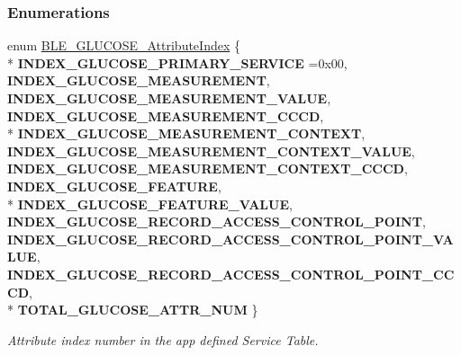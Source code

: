 \subsubsection*{Enumerations}
\begin{DoxyCompactItemize}
\item 
enum \hyperlink{group___b_l_e___g_s_gaebc08cd72805620fc1106a0b90462c83}{B\+L\+E\+\_\+\+G\+L\+U\+C\+O\+S\+E\+\_\+\+Attribute\+Index} \{ \\*
{\bfseries I\+N\+D\+E\+X\+\_\+\+G\+L\+U\+C\+O\+S\+E\+\_\+\+P\+R\+I\+M\+A\+R\+Y\+\_\+\+S\+E\+R\+V\+I\+CE} =0x00, 
{\bfseries I\+N\+D\+E\+X\+\_\+\+G\+L\+U\+C\+O\+S\+E\+\_\+\+M\+E\+A\+S\+U\+R\+E\+M\+E\+NT}, 
{\bfseries I\+N\+D\+E\+X\+\_\+\+G\+L\+U\+C\+O\+S\+E\+\_\+\+M\+E\+A\+S\+U\+R\+E\+M\+E\+N\+T\+\_\+\+V\+A\+L\+UE}, 
{\bfseries I\+N\+D\+E\+X\+\_\+\+G\+L\+U\+C\+O\+S\+E\+\_\+\+M\+E\+A\+S\+U\+R\+E\+M\+E\+N\+T\+\_\+\+C\+C\+CD}, 
\\*
{\bfseries I\+N\+D\+E\+X\+\_\+\+G\+L\+U\+C\+O\+S\+E\+\_\+\+M\+E\+A\+S\+U\+R\+E\+M\+E\+N\+T\+\_\+\+C\+O\+N\+T\+E\+XT}, 
{\bfseries I\+N\+D\+E\+X\+\_\+\+G\+L\+U\+C\+O\+S\+E\+\_\+\+M\+E\+A\+S\+U\+R\+E\+M\+E\+N\+T\+\_\+\+C\+O\+N\+T\+E\+X\+T\+\_\+\+V\+A\+L\+UE}, 
{\bfseries I\+N\+D\+E\+X\+\_\+\+G\+L\+U\+C\+O\+S\+E\+\_\+\+M\+E\+A\+S\+U\+R\+E\+M\+E\+N\+T\+\_\+\+C\+O\+N\+T\+E\+X\+T\+\_\+\+C\+C\+CD}, 
{\bfseries I\+N\+D\+E\+X\+\_\+\+G\+L\+U\+C\+O\+S\+E\+\_\+\+F\+E\+A\+T\+U\+RE}, 
\\*
{\bfseries I\+N\+D\+E\+X\+\_\+\+G\+L\+U\+C\+O\+S\+E\+\_\+\+F\+E\+A\+T\+U\+R\+E\+\_\+\+V\+A\+L\+UE}, 
{\bfseries I\+N\+D\+E\+X\+\_\+\+G\+L\+U\+C\+O\+S\+E\+\_\+\+R\+E\+C\+O\+R\+D\+\_\+\+A\+C\+C\+E\+S\+S\+\_\+\+C\+O\+N\+T\+R\+O\+L\+\_\+\+P\+O\+I\+NT}, 
{\bfseries I\+N\+D\+E\+X\+\_\+\+G\+L\+U\+C\+O\+S\+E\+\_\+\+R\+E\+C\+O\+R\+D\+\_\+\+A\+C\+C\+E\+S\+S\+\_\+\+C\+O\+N\+T\+R\+O\+L\+\_\+\+P\+O\+I\+N\+T\+\_\+\+V\+A\+L\+UE}, 
{\bfseries I\+N\+D\+E\+X\+\_\+\+G\+L\+U\+C\+O\+S\+E\+\_\+\+R\+E\+C\+O\+R\+D\+\_\+\+A\+C\+C\+E\+S\+S\+\_\+\+C\+O\+N\+T\+R\+O\+L\+\_\+\+P\+O\+I\+N\+T\+\_\+\+C\+C\+CD}, 
\\*
{\bfseries T\+O\+T\+A\+L\+\_\+\+G\+L\+U\+C\+O\+S\+E\+\_\+\+A\+T\+T\+R\+\_\+\+N\+UM}
 \}\hypertarget{group___b_l_e___g_s_gaebc08cd72805620fc1106a0b90462c83}{}\label{group___b_l_e___g_s_gaebc08cd72805620fc1106a0b90462c83}
\begin{DoxyCompactList}\small\item\em Attribute index number in the app defined Service Table. \end{DoxyCompactList}
\item 

\end{DoxyCompactItemize}
